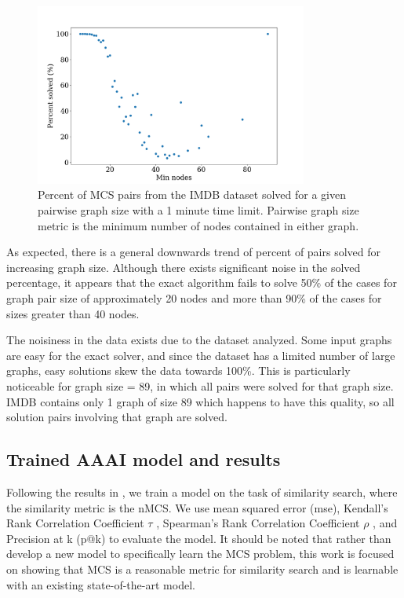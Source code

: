 \begin{figure}
    \center
    \includegraphics[width=0.8\textwidth]{figures/pct_solved_avg_nodes.png}
    \caption{Percent of MCS pairs from the IMDB dataset solved for a given pairwise graph size with a 1 minute time limit. Pairwise graph size metric is the minimum number of nodes contained in either graph.}
    \label{fig:solution_limits}
\end{figure}

As expected, there is a general downwards trend of percent of pairs solved for increasing graph size. Although there exists significant noise in the solved percentage, it appears that the exact algorithm fails to solve 50\% of the cases for graph pair size of approximately 20 nodes and more than 90\% of the cases for sizes greater than 40 nodes.

The noisiness in the data exists due to the dataset analyzed. Some input graphs are easy for the exact solver, and since the dataset has a limited number of large graphs, easy solutions skew the data towards 100\%. This is particularly noticeable for graph size = 89, in which all pairs were solved for that graph size. IMDB contains only 1 graph of size 89 which happens to have this quality, so all solution pairs involving that graph are solved.

\subsection{Trained AAAI model and results}
Following the results in \cite{bai2018convolutional}, we train a model on the task of similarity search, where the similarity metric is the nMCS. We use mean squared error (mse), Kendall's Rank Correlation Coefficient $\tau$ \cite{kendall1938new}, Spearman's Rank Correlation Coefficient $\rho$ \cite{spearman1904proof}, and Precision at k (p@k) to evaluate the model. It should be noted that rather than develop a new model to specifically learn the MCS problem, this work is focused on showing that MCS is a reasonable metric for similarity search and is learnable with an existing state-of-the-art model.


